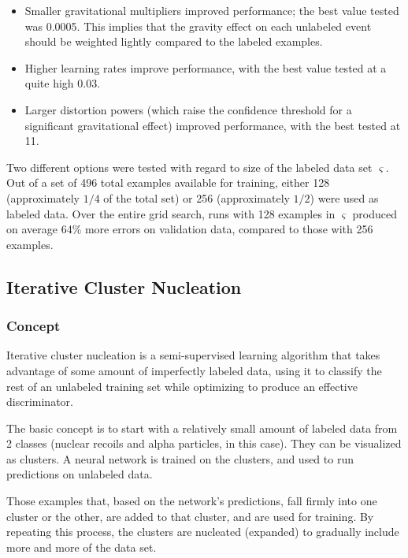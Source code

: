 \documentclass[10pt]{article}
\begin{document}
\begin{itemize}
    \item Smaller gravitational multipliers improved performance; the best value tested was 0.0005. This implies that the gravity effect on each unlabeled event should be weighted lightly compared to the labeled examples.
    \item Higher learning rates improve performance, with the best value tested at a quite high 0.03.
    \item Larger distortion powers (which raise the confidence threshold for a significant gravitational effect) improved performance, with the best tested at 11.
\end{itemize}

Two different options were tested with regard to size of the labeled data set $\varsigma$. Out of a set of 496 total examples available for training, either 128 (approximately $1/4$ of the total set) or 256 (approximately $1/2$) were used as labeled data. Over the entire grid search, runs with 128 examples in $\varsigma$ produced on average 64\% more errors on validation data, compared to those with 256 examples.

\subsection{Iterative Cluster Nucleation}

\subsubsection{Concept}

Iterative cluster nucleation is a semi-supervised learning algorithm that takes advantage of some amount of imperfectly labeled data, using it to classify the rest of an unlabeled training set while optimizing to produce an effective discriminator.

The basic concept is to start with a relatively small amount of labeled data from 2 classes (nuclear recoils and alpha particles, in this case). They can be visualized as clusters. A neural network is trained on the clusters, and used to run predictions on unlabeled data.

Those examples that, based on the network's predictions, fall firmly into one cluster or the other, are added to that cluster, and are used for training. By repeating this process, the clusters are nucleated (expanded) to gradually include more and more of the data set.
\end{document}
